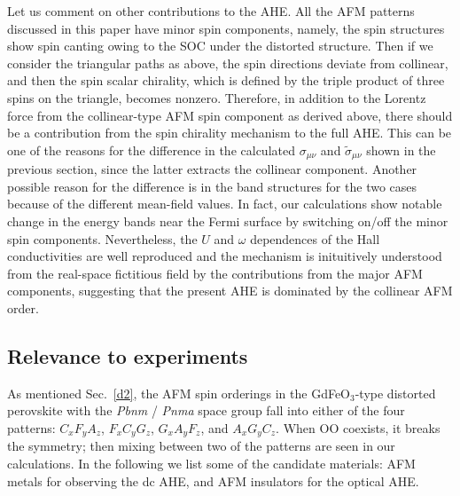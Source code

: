 \documentclass[aps,twocolumn,prb,preprintnumbers,amsmath,amssymb]{revtex4-2}
\begin{document}
Let us comment on other contributions to the AHE. 
All the AFM patterns discussed in this paper have minor spin components, 
 namely, the spin structures show spin canting owing to the SOC under the distorted structure. 
Then if we consider the triangular paths as above, the spin directions deviate from collinear, and then the spin scalar chirality, which is defined by the triple product of three spins on the triangle, becomes nonzero. 
Therefore, in addition to the Lorentz force from the collinear-type AFM spin component as derived above, 
 there should be a contribution from the spin chirality mechanism to the full AHE.  
This can be one of the reasons for the difference in the calculated $\sigma_{\mu\nu}$ and $\tilde{\sigma}_{\mu\nu}$ 
 shown in the previous section, since the latter extracts the collinear component. 
Another possible reason for the difference is in the band structures for the two cases because of the different mean-field values. 
In fact, our calculations show notable change in the energy bands near the Fermi surface by switching on/off the minor spin components. 
Nevertheless, the $U$ and $\omega$ dependences of the Hall conductivities are well reproduced and the mechanism is inituitively understood from the real-space fictitious field by the contributions from the major AFM components, suggesting that the present AHE is dominated by the collinear AFM order.

\subsection{Relevance to experiments}\label{experiments}

As mentioned Sec.~\ref{d2}, the AFM spin orderings in the GdFeO$_3$-type distorted perovskite 
 with the {\it Pbnm} / {\it Pnma} space group fall into either of the four patterns: 
 $C_x F_y A_z$, $F_x C_y G_z$,  $G_x A_y F_z$, and $A_x G_y C_z$. 
When OO coexists, it breaks the symmetry; then mixing between two of the patterns are seen in our calculations. 
In the following we list some of the candidate materials: AFM metals for observing the dc AHE,  
 and AFM insulators for the optical AHE. 
\end{document}
